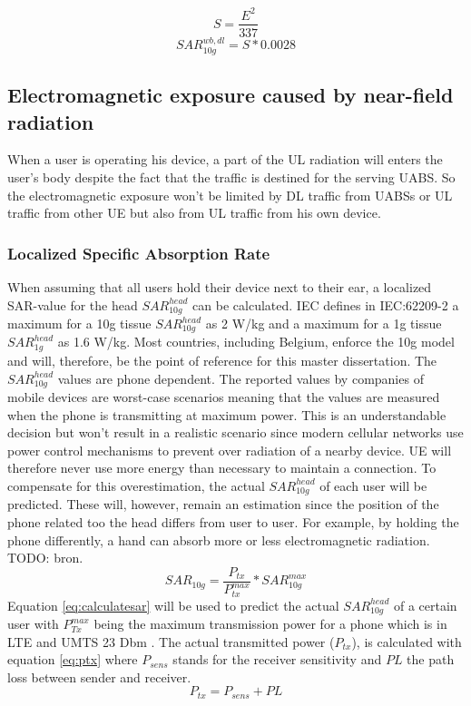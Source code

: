 \begin{equation}
S  = \frac{E^2}{337}
\label{eq:flux}
\end{equation}
\begin{equation}
SAR^{wb,dl}_{10g} = S * 0.0028
\label{eq:convertion}
\end{equation}

\subsection{Electromagnetic exposure caused by near-field radiation}
\label{sub:Uplinkexposure}
When a user is operating his device, a part of the \gls{UL} radiation will enters the user's body despite the fact that the 
 traffic is destined for the serving \gls{UABS}. So the 
 electromagnetic exposure won't be limited by \gls{DL} traffic from \gls{UABS}s or \gls{UL} traffic 
from other \gls{UE} but also from \gls{UL} traffic from his own device.

\subsubsection{Localized Specific Absorption Rate}

When assuming that all users hold their device next to their ear, a localized SAR-value for the head $SAR^{head}_{10g}$ can be calculated.
\gls{IEC} defines in IEC:62209-2 a maximum for a 10g tissue $SAR^{head}_{10g}$ as 2 W/kg and a maximum for a 1g tissue $SAR^{head}_{1g}$ as 1.6 W/kg.
Most countries, including Belgium, enforce the 10g model and will, therefore, be the point of reference for this master dissertation.
The $SAR^{head}_{10g}$ values are phone dependent. The reported values by companies of mobile devices are worst-case scenarios meaning that the 
values are measured when the phone is transmitting at maximum power. This is an understandable decision but won't result in a realistic scenario since 
modern cellular networks use power control mechanisms to prevent over radiation of a nearby device. \gls{UE} will therefore never use more energy than 
necessary to maintain a connection.
To compensate for this overestimation, the actual $SAR^{head}_{10g}$ of each user will be predicted. These will, however, remain an estimation since the 
position of the phone related too the head differs from user to user. For example, by holding the phone differently, a hand can absorb more or less 
electromagnetic radiation. TODO: bron. 
\begin{equation}
{SAR}_{10g} = \frac{P_{tx}}{P^{max}_{tx}} * {SAR}^{max}_{10g}
\label{eq:calculatesar}
\end{equation}
Equation \ref{eq:calculatesar} will be used to predict the actual $SAR^{head}_{10g}$  of a certain user with 
$P^{max}_{Tx}$ being the maximum transmission power for a phone which is in \gls{LTE} and UMTS 23 Dbm \cite{J11_maxTpxUE, J10_RDP}.
The actual transmitted power ($P_{tx}$), is calculated with equation \ref{eq:ptx} where $P_{sens}$
stands for the receiver sensitivity and $PL$ the path loss between sender and receiver.
\begin{equation}
P_{tx} = P_{sens} + PL
\label{eq:ptx}
\end{equation}
 
